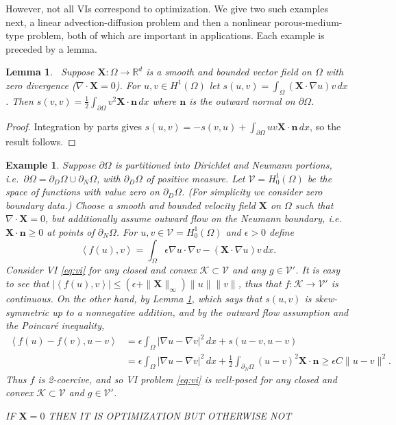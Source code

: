 \documentclass[letterpaper,final,12pt,reqno]{amsart}
\theoremstyle{cstyle}
\newtheorem{lemma}[theorem]{Lemma}
\theoremstyle{cstyle*}
\theoremstyle{dstyle}
\newtheorem{example}[theorem]{Example}
\numberwithin{equation}{section}
\numberwithin{figure}{section}
\numberwithin{table}{section}
\numberwithin{theorem}{section}
\newcommand{\eps}{\epsilon}
\newcommand{\RR}{\mathbb{R}}
\newcommand{\grad}{\nabla}
\newcommand{\Div}{\nabla\cdot}
\newcommand{\bn}{\mathbf{n}}
\newcommand{\bX}{\mathbf{X}}
\newcommand{\cK}{\mathcal{K}}
\newcommand{\cV}{\mathcal{V}}
\newcommand{\ip}[2]{\left<#1,#2\right>}
\begin{document}
However, not all VIs correspond to optimization.  We give two such examples next, a linear advection-diffusion problem and then a nonlinear porous-medium-type problem, both of which are important in applications.  Each example is preceded by a lemma.

\begin{lemma}  \label{lem:advectionskew}  \cite{Elmanetal2014}\,  Suppose $\bX :\Omega \to \RR^d$ is a smooth and bounded vector field on $\Omega$ with zero divergence ($\Div \bX=0$).  For $u,v \in H^1(\Omega)$ let $s(u,v) = \int_\Omega (\bX \cdot \grad u) v\,dx$.  Then $s(v,v) = \frac{1}{2} \int_{\partial \Omega} v^2 \bX\cdot \bn\,dx$ where $\bn$ is the outward normal on $\partial \Omega$.
\end{lemma}

\begin{proof}
Integration by parts gives $s(u,v) = - s(v,u) + \int_{\partial \Omega} uv \bX\cdot \bn\,dx$, so the result follows.
\end{proof}

\begin{example}  \label{ex:advectiondiffusion}  Suppose $\partial\Omega$ is partitioned into Dirichlet and Neumann portions, i.e.~$\partial\Omega = \partial_D\Omega \cup \partial_N\Omega$, with $\partial_D\Omega$ of positive measure.  Let $\cV = H_0^1(\Omega)$ be the space of functions with value zero on $\partial_D\Omega$.  (For simplicity we consider zero boundary data.)  Choose a smooth and bounded velocity field $\bX$ on $\Omega$ such that $\Div \bX=0$, but additionally assume outward flow on the Neumann boundary, i.e.~$\bX \cdot \bn \ge 0$ at points of $\partial_N\Omega$.  For $u,v \in \cV = H_0^1(\Omega)$ and $\eps>0$ define
\begin{equation}
\ip{f(u)}{v} = \int_\Omega \eps \grad u \cdot \grad v - (\bX \cdot \grad u) v\,dx. \label{eq:advectiondiffusion}
\end{equation}
Consider VI \eqref{eq:vi} for any closed and convex $\cK \subset \cV$ and any $g\in\cV'$.  It is easy to see that $|\ip{f(u)}{v}| \le (\eps + \|\bX\|_\infty) \|u\| \|v\|$, thus that $f:\cK \to \cV'$ is continuous.  On the other hand, by Lemma \ref{lem:advectionskew}, which says that $s(u,v)$ is skew-symmetric up to a nonnegative addition, and by the outward flow assumption and the Poincar\'e inequality,
\begin{align*}
\ip{f(u)-f(v)}{u-v} &= \eps \int_\Omega |\grad u - \grad v|^2\,dx + s(u-v,u-v) \\
                    &= \eps \int_\Omega |\grad u - \grad v|^2\,dx + \frac{1}{2} \int_{\partial_N\Omega} (u-v)^2 \bX\cdot\bn \ge \eps C \|u-v\|^2.
\end{align*}
Thus $f$ is 2-coercive, and so VI problem \eqref{eq:vi} is well-posed for any closed and convex $\cK \subset \cV$ and $g\in \cV'$.

IF $\bX=0$ THEN IT IS OPTIMIZATION BUT OTHERWISE NOT
\end{example}
\end{document}
